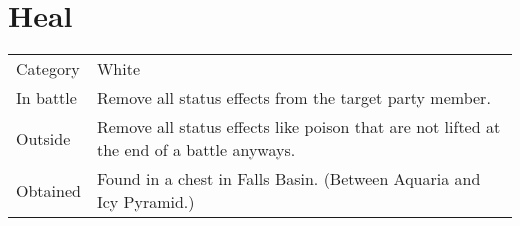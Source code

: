\section{Heal}
\label{spell:heal}


\noindent\begin{tabularx}{\textwidth}[l]{lX}
	Category
	& White
\\ %
	In battle
	& Remove all status effects from the target party member.
\\ %
	Outside
	& Remove all status effects like poison that are not lifted at the end of a battle anyways.
\\ %
	Obtained
	& Found in a chest in Falls Basin. (Between Aquaria and Icy Pyramid.)
\end{tabularx}
